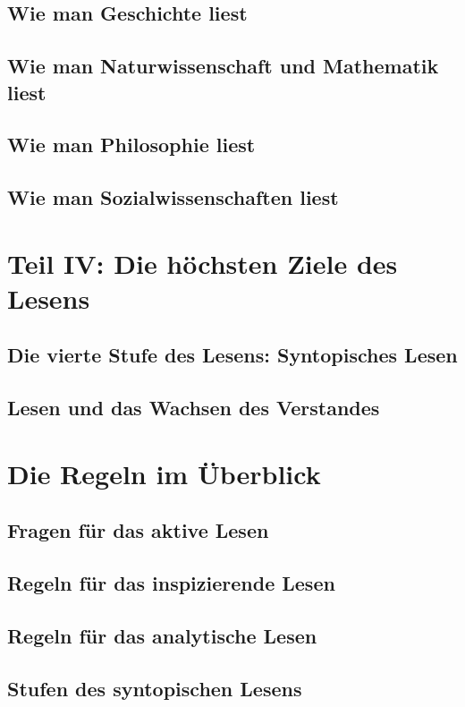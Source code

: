 \documentclass[a4paper,12pt]{scrartcl}
\begin{document}
\subsection{Wie man Geschichte liest}
\subsection{Wie man Naturwissenschaft und Mathematik liest}
\subsection{Wie man Philosophie liest}
\subsection{Wie man Sozialwissenschaften liest}

\newpage
\section*{Teil IV: Die höchsten Ziele des Lesens}
\subsection{Die vierte Stufe des Lesens: Syntopisches Lesen}
\subsection{Lesen und das Wachsen des Verstandes}

\newpage
\section*{Die Regeln im Überblick}
\subsection{Fragen für das aktive Lesen}
\subsection{Regeln für das inspizierende Lesen}
\subsection{Regeln für das analytische Lesen}
\subsection{Stufen des syntopischen Lesens}

\newpage


\end{document}
